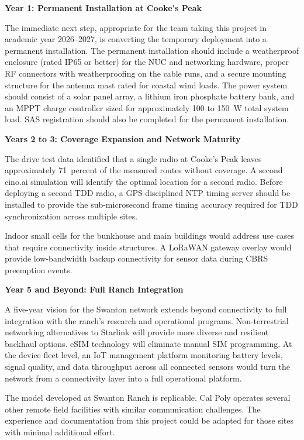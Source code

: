 \documentclass[
    left=1.5in,
    right=1.25in,
    top=1.25in,
    bottom=1.25in
]{CalPolySeniorProject}
\begin{document}
\textbf{Year 1: Permanent Installation at Cooke's Peak}

The immediate next step, appropriate for the team taking this project in
academic year 2026--2027, is converting the temporary deployment into a
permanent installation. The permanent installation should include a weatherproof
enclosure (rated IP65 or better) for the NUC and networking hardware, proper RF
connectors with weatherproofing on the cable runs, and a secure mounting
structure for the antenna mast rated for coastal wind loads. The power system
should consist of a solar panel array, a lithium iron phosphate battery bank, and
an MPPT charge controller sized for approximately 100 to 150~W total system load.
SAS registration should also be completed for the permanent installation.

\textbf{Years 2 to 3: Coverage Expansion and Network Maturity}

The drive test data identified that a single radio at Cooke's Peak leaves
approximately 71~percent of the measured routes without coverage. A second
eino.ai simulation will identify the optimal location for a second radio. Before deploying a second TDD radio, a
GPS-disciplined NTP timing server should be installed to provide the
sub-microsecond frame timing accuracy required for TDD synchronization across
multiple sites.

Indoor small cells for the bunkhouse and main buildings would address use cases
that require connectivity inside structures. A LoRaWAN gateway overlay would
provide low-bandwidth backup connectivity for sensor data during CBRS preemption
events.

\textbf{Year 5 and Beyond: Full Ranch Integration}

A five-year vision for the Swanton network extends beyond connectivity to full
integration with the ranch's research and operational programs.
Non-terrestrial networking alternatives to Starlink will provide more diverse
and resilient backhaul options. eSIM technology will eliminate manual SIM
programming. At the device fleet level, an IoT management platform monitoring
battery levels, signal quality, and data throughput across all connected sensors
would turn the network from a connectivity layer into a full operational
platform.

The model developed at Swanton Ranch is replicable. Cal Poly operates several
other remote field facilities with similar communication challenges. The
experience and documentation from this project could be adapted for those sites
with minimal additional effort.
\end{document}
